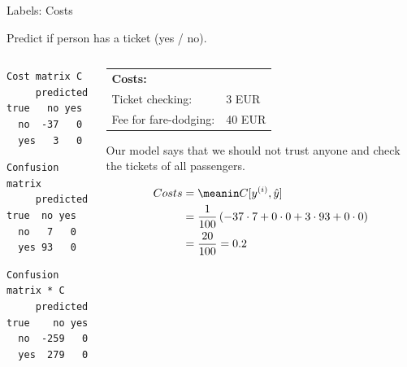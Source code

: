 \begin{vbframe}{Labels: Costs}

Predict if person has a ticket (yes / no).\\ 

\begin{columns}
\begin{column}{0.3\textwidth} 

\begin{knitrout}\scriptsize
{}\color{fgcolor}\begin{kframe}
\begin{verbatim}
Cost matrix C
     predicted
true   no yes
  no  -37   0
  yes   3   0
\end{verbatim}
\end{kframe} \begin{kframe}\begin{verbatim}
Confusion matrix
     predicted
true  no yes
  no   7   0
  yes 93   0
\end{verbatim}
\end{kframe} \begin{kframe}\begin{verbatim}
Confusion matrix * C
     predicted
true    no yes
  no  -259   0
  yes  279   0
\end{verbatim}
\end{kframe}
\end{knitrout}

\end{column}
\begin{column}{0.65\textwidth}


  \begin{tabular}{ll}
    \textbf{Costs:} & \\
    Ticket checking:& 3 EUR\\
    Fee for fare-dodging:& 40 EUR\\
  \end{tabular}
  \lz
  
  Our model says that we should not trust anyone and check the tickets of 
  all passengers.
  
  
  \begin{align*}
      Costs &= \meanin C[\yi, \yih] \\
      &= \frac{1}{100} \left( 
      -37 \cdot 7 + 
      0 \cdot 0 + 
      3 \cdot 93 +
      0 \cdot 0 
      \right) \\
      &= \frac{20}{100} = 0.2
    \end{align*}
\end{column}

\end{columns}


\end{vbframe}


